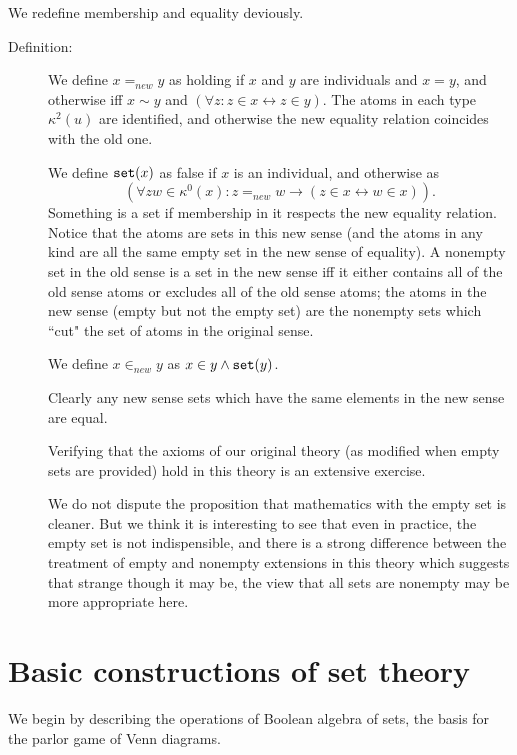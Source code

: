 \documentclass[12pt]{article}
\begin{document}
We redefine membership and equality deviously.

\begin{description}

\item[Definition:]  We define $x=_{new}y$ as holding if $x$ and $y$ are individuals and $x=y$,
and otherwise iff $x \sim y$ and $(\forall z:z \in x \leftrightarrow z\in y)$.  The atoms in each type $\kappa^2(u)$ are
 identified, and otherwise the new equality relation coincides with the old one.

We define ${\tt set}(x)$ as false if $x$ is an individual, and otherwise as $$(\forall zw \in \kappa^0(x):z=_{new}w \rightarrow (z \in x \leftrightarrow w \in x)).$$ Something is a set if membership in it respects the new equality relation.
Notice that the atoms are sets in this new sense (and the atoms in any kind are all the same empty set in the new sense of equality).  A nonempty set in the old sense is a set in the new sense iff it either contains all of the old sense atoms or excludes all of the old sense atoms; the atoms in the new sense (empty but not the empty set) are the nonempty sets which ``cut" the set of atoms in the original sense.

We define $x \in_{new}y$ as $x \in y \wedge {\tt set}(y)$.

Clearly any new sense sets which have the same elements in the new sense are equal.

Verifying that the axioms of our original theory (as modified when empty sets are provided) hold in this theory is an extensive exercise.

We do not dispute the proposition that mathematics with the empty set is cleaner.  But we think it is interesting to see that even in practice, the empty set is not indispensible, and there is a strong difference between the treatment of empty and nonempty extensions in this theory which suggests that strange though it may be, the view that all sets are nonempty may be more appropriate here.



\end{description}

\newpage

\section{Basic constructions of set theory}

We begin by describing the operations of Boolean algebra of sets, the basis for the parlor game of Venn diagrams.
\end{document}
